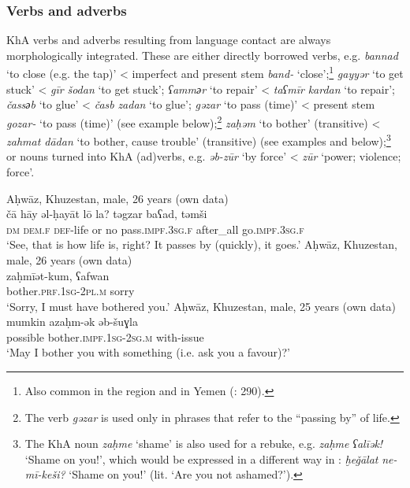\documentclass[output=paper,nonflat]{langsci/langscibook}
\begin{document}
\subsubsection{Verbs and adverbs} 

KhA verbs and adverbs resulting from language contact are always morphologically integrated. These are either directly borrowed  verbs, e.g. \textit{bannad} ‘to close (e.g. the tap)’ <  imperfect and present {stem} \textit{band-} ‘close’;\footnote{Also common in the  region and in {Yemen} (\citealt{BehnstedtWoidich2014}: 290).} \textit{gayyər} ‘to get stuck’ <   \textit{gīr} \textit{šodan} ‘to get stuck’; \textit{ʕamm{әr}} ‘to repair’ <  \textit{taʕmīr} \textit{kardan} ‘to repair’; \textit{čass{әb}} ‘to glue’ <  \textit{časb} \textit{zadan} ‘to glue’; \textit{gəzar} ‘to pass (time)’ <  present {stem} \textit{gozar-} ‘to pass (time)’ (see example  below);\footnote{The verb \textit{gəzar} is used only in phrases that refer to the “passing by” of life.} \textit{zaḥəm} ‘to bother’ (transitive) <  \textit{zahmat dādan} ‘to bother, cause trouble’ (transitive) (see examples  and  below);\footnote{The KhA noun \textit{zaḥme} `shame' is also used for a rebuke, e.g. \textit{zaḥme} \textit{ʕalīək!} ‘Shame on you!’, which would be expressed in a different way in : \textit{ḫeǧālat} \textit{ne-mī-keši?} ‘Shame on you!' (lit. ‘Are you not ashamed?’).} or  nouns turned into KhA (ad)verbs, e.g. \textit{əb-zūr} ‘by force’ <  \textit{zūr} ‘power; violence; force’.

\ea
{Aḥwāz, Khuzestan, male, 26 years (own data)}\\ \label{ca}
\gll čā hāy əl-ḥayāt lō la? təgzar baʕad, təmši\\
     \textsc{dm} \textsc{dem}.\textsc{f} \textsc{def}{}-life or no pass.\textsc{impf}.\textsc{3sg.f} after\_all go.\textsc{impf.3sg.f}\\
\glt ‘See, that is how life is, right? It passes by (quickly), it goes.’
\ex \label{zah}
{Aḥwāz, Khuzestan, male, 26 years (own data)}\\
\gll zaḥmīət-kum, ʕafwan\\
     bother.\textsc{prf}.\textsc{1sg}{}-\textsc{2pl.m} sorry\\
\glt ‘Sorry, I must have bothered you.’\footnotemark
\ex \label{mumkin}
{Aḥwāz, Khuzestan, male, 25 years (own data)}\\
\gll mumkin azaḥm-ək əb-šuɣla\\
     possible bother.\textsc{impf}.\textsc{1sg}{}-\textsc{2sg.m} with-issue\\
\glt ‘May I bother you with something (i.e. ask you a favour)?’
\z
\end{document}
